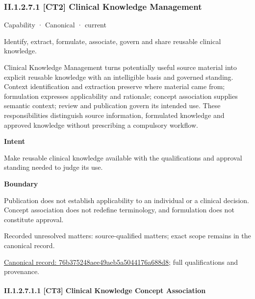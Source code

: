 \subsubsection*{II.1.2.7.1 [CT2] Clinical Knowledge Management}
\label{navigation:II.1.2.7.1}

\label{element:76b375248aee49aeb5a5044176a688d8}
{\small Capability · Canonical · current}\par

Identify, extract, formulate, associate, govern and share reusable clinical knowledge.



Clinical Knowledge Management turns potentially useful source material into explicit reusable knowledge with an intelligible basis and governed standing. Context identification and extraction preserve where material came from; formulation expresses applicability and rationale; concept association supplies semantic context; review and publication govern its intended use. These responsibilities distinguish source information, formulated knowledge and approved knowledge without prescribing a compulsory workflow.



\textbf{Intent}



Make reusable clinical knowledge available with the qualifications and approval standing needed to judge its use.



\textbf{Boundary}



Publication does not establish applicability to an individual or a clinical decision. Concept association does not redefine terminology, and formulation does not constitute approval.


{\small Recorded unresolved matters: source-qualified matters; exact scope remains in the canonical record.}\par
{\footnotesize \href{../../../../../../../continuum/strategy/capability/76b375248aee49aeb5a5044176a688d8.md}{Canonical record: 76b375248aee49aeb5a5044176a688d8}; full qualifications and provenance.}\par
\paragraph*{II.1.2.7.1.1 [CT3] Clinical Knowledge Concept Association}
\label{navigation:II.1.2.7.1.1}

